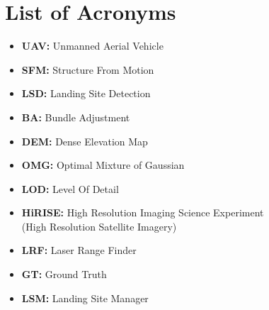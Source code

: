 \chapter*{List of Acronyms}

\begin{itemize}
    \item \textbf{UAV: } Unmanned Aerial Vehicle
    \item \textbf{SFM: } Structure From Motion
    \item \textbf{LSD: } Landing Site Detection
    \item \textbf{BA: } Bundle Adjustment
    \item \textbf{DEM: } Dense Elevation Map
    \item \textbf{OMG: } Optimal Mixture of Gaussian
    \item \textbf{LOD: } Level Of Detail
    \item \textbf{HiRISE: } High Resolution Imaging Science Experiment \\(High Resolution Satellite Imagery)
    \item \textbf{LRF: } Laser Range Finder
    \item \textbf{GT: } Ground Truth
    \item \textbf{LSM: } Landing Site Manager
\end{itemize}